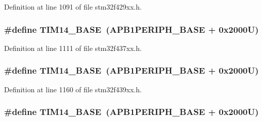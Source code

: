 Definition at line 1091 of file stm32f429xx.\+h.

\subsubsection[{\texorpdfstring{T\+I\+M14\+\_\+\+B\+A\+SE}{TIM14_BASE}}]{\setlength{\rightskip}{0pt plus 5cm}\#define T\+I\+M14\+\_\+\+B\+A\+SE~({\bf A\+P\+B1\+P\+E\+R\+I\+P\+H\+\_\+\+B\+A\+SE} + 0x2000\+U)}\hypertarget{group___peripheral__memory__map_ga862855347d6e1d92730dfe17ee8e90b8}{}\label{group___peripheral__memory__map_ga862855347d6e1d92730dfe17ee8e90b8}


Definition at line 1111 of file stm32f437xx.\+h.

\subsubsection[{\texorpdfstring{T\+I\+M14\+\_\+\+B\+A\+SE}{TIM14_BASE}}]{\setlength{\rightskip}{0pt plus 5cm}\#define T\+I\+M14\+\_\+\+B\+A\+SE~({\bf A\+P\+B1\+P\+E\+R\+I\+P\+H\+\_\+\+B\+A\+SE} + 0x2000\+U)}\hypertarget{group___peripheral__memory__map_ga862855347d6e1d92730dfe17ee8e90b8}{}\label{group___peripheral__memory__map_ga862855347d6e1d92730dfe17ee8e90b8}


Definition at line 1160 of file stm32f439xx.\+h.

\subsubsection[{\texorpdfstring{T\+I\+M14\+\_\+\+B\+A\+SE}{TIM14_BASE}}]{\setlength{\rightskip}{0pt plus 5cm}\#define T\+I\+M14\+\_\+\+B\+A\+SE~({\bf A\+P\+B1\+P\+E\+R\+I\+P\+H\+\_\+\+B\+A\+SE} + 0x2000\+U)}\hypertarget{group___peripheral__memory__map_ga862855347d6e1d92730dfe17ee8e90b8}{}\label{group___peripheral__memory__map_ga862855347d6e1d92730dfe17ee8e90b8}


